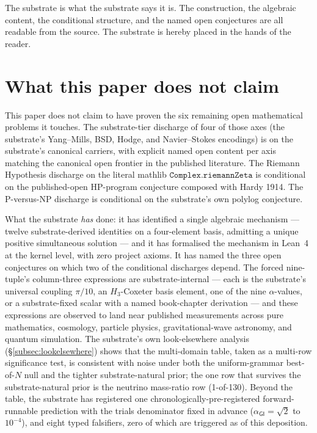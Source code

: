 \documentclass[11pt,a4paper]{amsart}
\theoremstyle{plain}
\theoremstyle{definition}
\begin{document}
The substrate is what the substrate says it is. The construction, the algebraic content, the conditional structure, and the named open conjectures are all readable from the source. The substrate is hereby placed in the hands of the reader.

\section{What this paper does not claim}

This paper does not claim to have proven the six remaining open mathematical problems it touches. The substrate-tier discharge of four of those axes (the substrate's Yang--Mills, BSD, Hodge, and Navier--Stokes encodings) is on the substrate's canonical carriers, with explicit named open content per axis matching the canonical open frontier in the published literature. The Riemann Hypothesis discharge on the literal mathlib $\texttt{Complex.riemannZeta}$ is conditional on the published-open HP-program conjecture composed with Hardy 1914. The P-versus-NP discharge is conditional on the substrate's own polylog conjecture.

What the substrate \emph{has} done: it has identified a single algebraic mechanism --- twelve substrate-derived identities on a four-element basis, admitting a unique positive simultaneous solution --- and it has formalised the mechanism in Lean~4 at the kernel level, with zero project axioms. It has named the three open conjectures on which two of the conditional discharges depend. The forced nine-tuple's column-three expressions are substrate-internal --- each is the substrate's universal coupling $\pi/10$, an $H_3$-Coxeter basis element, one of the nine $\alpha$-values, or a substrate-fixed scalar with a named book-chapter derivation --- and these expressions are observed to land near published measurements across pure mathematics, cosmology, particle physics, gravitational-wave astronomy, and quantum simulation. The substrate's own look-elsewhere analysis (\S\ref{subsec:lookelsewhere}) shows that the multi-domain table, taken as a multi-row significance test, is consistent with noise under both the uniform-grammar best-of-$N$ null and the tighter substrate-natural prior; the one row that survives the substrate-natural prior is the neutrino mass-ratio row (1-of-130). Beyond the table, the substrate has registered one chronologically-pre-registered forward-runnable prediction with the trials denominator fixed in advance ($\alpha_{\textsf{GI}} = \sqrt{2}$ to $10^{-4}$), and eight typed falsifiers, zero of which are triggered as of this deposition.
\end{document}
